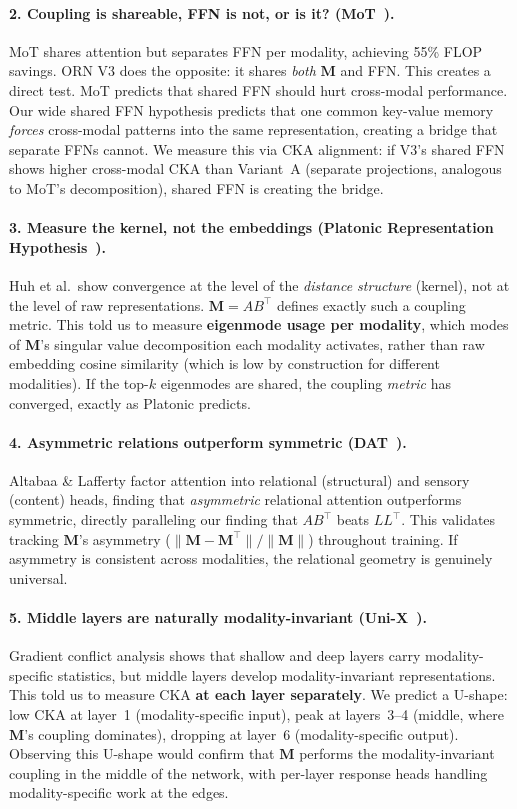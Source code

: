 \documentclass[11pt, a4paper]{article}
\newcommand{\M}{\mathbf{M}}
\theoremstyle{plain}
\theoremstyle{remark}
\begin{document}
\paragraph{2. Coupling is shareable, FFN is not, or is it? (MoT~\cite{liang2024mot}).}
MoT shares attention but separates FFN per modality, achieving 55\% FLOP savings.
ORN V3 does the opposite: it shares \emph{both} $\M$ and FFN.
This creates a direct test.
MoT predicts that shared FFN should hurt cross-modal performance.
Our wide shared FFN hypothesis predicts that one common key-value memory \emph{forces} cross-modal patterns into the same representation, creating a bridge that separate FFNs cannot.
We measure this via CKA alignment: if V3's shared FFN shows higher cross-modal CKA than Variant~A (separate projections, analogous to MoT's decomposition), shared FFN is creating the bridge.

\paragraph{3. Measure the kernel, not the embeddings (Platonic Representation Hypothesis~\cite{huh2024platonic}).}
Huh et al.\ show convergence at the level of the \emph{distance structure} (kernel), not at the level of raw representations.
$\M = AB^\top$ defines exactly such a coupling metric.
This told us to measure \textbf{eigenmode usage per modality}, which modes of $\M$'s singular value decomposition each modality activates, rather than raw embedding cosine similarity (which is low by construction for different modalities).
If the top-$k$ eigenmodes are shared, the coupling \emph{metric} has converged, exactly as Platonic predicts.

\paragraph{4. Asymmetric relations outperform symmetric (DAT~\cite{altabaa2024dat}).}
Altabaa \& Lafferty factor attention into relational (structural) and sensory (content) heads, finding that \emph{asymmetric} relational attention outperforms symmetric, directly paralleling our finding that $AB^\top$ beats $LL^\top$.
This validates tracking $\M$'s asymmetry ($\|\M - \M^\top\|/\|\M\|$) throughout training.
If asymmetry is consistent across modalities, the relational geometry is genuinely universal.

\paragraph{5. Middle layers are naturally modality-invariant (Uni-X~\cite{uni2025x}).}
Gradient conflict analysis shows that shallow and deep layers carry modality-specific statistics, but middle layers develop modality-invariant representations.
This told us to measure CKA \textbf{at each layer separately}.
We predict a U-shape: low CKA at layer~1 (modality-specific input), peak at layers~3--4 (middle, where $\M$'s coupling dominates), dropping at layer~6 (modality-specific output).
Observing this U-shape would confirm that $\M$ performs the modality-invariant coupling in the middle of the network, with per-layer response heads handling modality-specific work at the edges.
\end{document}
